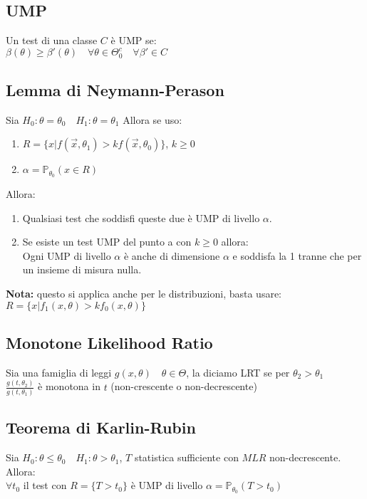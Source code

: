 \documentclass[a4paper,notitlepage]{report}%
\newcommand{\p}{\mathbb{P}} %
\begin{document}
\begin{multicols*}{2}
    \subsection*{UMP}
    Un test di una classe $C$ è UMP se:\\
    $\beta(\theta)\geq\beta'(\theta) \quad \forall\theta\in\Theta_0^c\quad \forall \beta'\in C$


    \subsection*{Lemma di Neymann-Perason}
    Sia $H_0: \theta = \theta_0 \quad H_1: \theta = \theta_1$
    Allora se uso:
    \begin{enumerate}
        \item $R=\{x| f(\vec{x},\theta_1)>kf(\vec{x},\theta_0) \}$, $k\geq0$
        \item $\alpha = \p_{\theta_0}(x\in R)$
    \end{enumerate}
    Allora:
    \begin{enumerate}[label=\alph*]
        \item Qualsiasi test che soddisfi queste due è UMP
            di livello $\alpha$.
        \item Se esiste un test UMP del punto a con $k\geq0$ allora:\\
            Ogni UMP di livello $\alpha$ è anche di dimensione $\alpha$
            e soddisfa la 1 tranne che per un insieme di misura nulla.
    \end{enumerate}
    \textbf{Nota:} questo si applica anche per le distribuzioni, 
    basta usare: \\
    $R=\{x| f_1(x,\theta)>kf_0(x,\theta) \}$
    

    \subsection*{Monotone Likelihood Ratio}
    Sia una famiglia di leggi $g(x,\theta) \quad\theta\in\Theta$,
    la diciamo LRT se per $\theta_2 > \theta_1$ \\
    $\frac{ g(t,\theta_2 )}{g(t,\theta_1 )}$ è monotona in $t$ (non-crescente o non-decrescente)


    \subsection*{Teorema di Karlin-Rubin}
    Sia $H_0: \theta \leq \theta_0 \quad H_1: \theta > \theta_1$,
    $T$ statistica sufficiente con $MLR$ non-decrescente. Allora: \\
    $\forall t_0$ il test con $R=\{ T > t_0 \}$ è UMP di livello
    $\alpha= \p_{\theta_0}(T>t_0)$


\end{multicols*}
\end{document}
